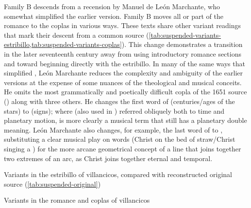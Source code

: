 Family B descends from a recension by Manuel de León Marchante, who somewhat
simplified the earlier version.%
    \Autocite{LeonMarchante:Obras1733} %
Family B moves all or part of the romance to the coplas in various ways.
These texts share other variant readings that mark their descent from a common
source (\cref{tab:suspended-variants-estribillo,tab:suspended-variants-coplas}).
This change demonstrates a transition in the later seventeenth century away from
using introductory romance sections and toward beginning directly with
the estribillo.%
In many of the same ways that  simplified
, León Marchante reduces the complexity and
ambiguity of the earlier versions at the expense of some nuances of the
theological and musical conceits.
He omits the most grammatically and poetically difficult copla of the 1651
source () along with three others.
He changes the first word of  (centuries/ages of
the stars) to  (signs); where  (also used in
) referred obliquely both to time and planetary motion,
 is more clearly a musical term that still has a planetary
double meaning.
León Marchante also changes, for example, the last word of  to , substituting a clear musical play on words
(Christ  on the bed of straw/Christ singing a )
for the more arcane geometrical concept of a line that joins together two
extremes of an arc, as Christ joins together eternal and temporal.

{Variants in the estribillo of  villancicos,
compared with reconstructed original source (\cref{tab:suspended-original})}

{Variants in the romance and coplas of  villancicos}

